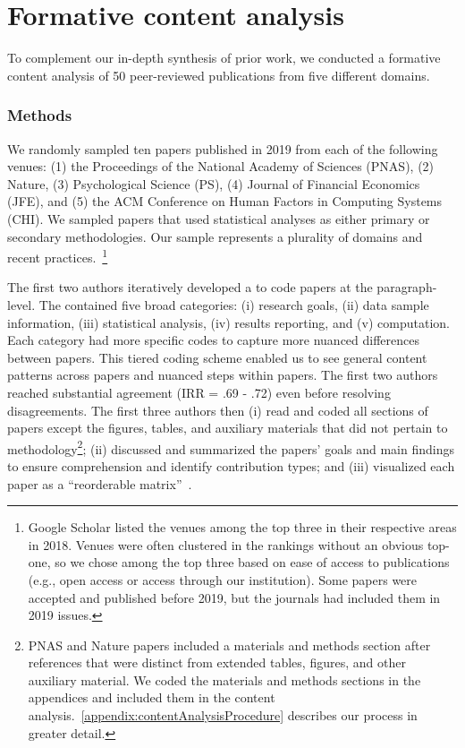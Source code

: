 \section{Formative content analysis} \label{sec:contentAnalysisHypoForm} 
To complement our in-depth synthesis of prior work, we conducted a formative
content analysis of 50 peer-reviewed publications from five different domains. 

\subsubsection{Methods}
We randomly sampled ten papers published in 2019 from each of the following
venues: (1) the Proceedings of the National Academy of Sciences (PNAS), (2)
Nature, (3) Psychological Science (PS), (4) Journal of Financial Economics
(JFE), and (5) the ACM Conference on Human Factors in Computing Systems (CHI).
We sampled papers that used statistical analyses as either primary or secondary
methodologies. Our sample represents a plurality of domains and recent
practices.~\footnote{Google Scholar listed the venues among the top three in
their respective areas in 2018. Venues were often clustered in the rankings
without an obvious top-one, so we chose among the top three based on ease of
access to publications (e.g., open access or access through our institution).
Some papers were accepted and published before 2019, but the journals had
included them in 2019 issues.}


The first two authors iteratively developed a \codebook to code papers at the
paragraph-level. The \codebook contained five broad categories: (i) research
goals, (ii) data sample information, (iii) statistical analysis, (iv) results
reporting, and (v) computation. Each category had more specific codes to capture
more nuanced differences between papers. This tiered coding scheme enabled us to
see general content patterns across papers and nuanced steps within papers. The
first two authors reached substantial agreement (IRR = .69 - .72) even before
resolving disagreements. The first three authors then (i) read and coded all
sections of papers except the figures, tables, and auxiliary materials that did
not pertain to methodology\footnote{PNAS and Nature papers included a materials
and methods section after references that were distinct from extended tables,
figures, and other auxiliary material. We coded the materials and methods
sections in the appendices and included them in the content
analysis.~\autoref{appendix:contentAnalysisProcedure} describes our process in
greater detail.}; (ii) discussed and summarized the papers' goals and main
findings to ensure comprehension and identify contribution types; and (iii)
visualized each paper as a ``reorderable matrix''~\cite{bertin2011graphics}. 

